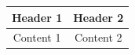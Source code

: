 \documentclass{article}
\begin{document}
\begin{tabular}{|c|c|}
\hline
\rowcolor[gray]{0.9}
\parbox[c]{3cm}{\vspace{0.2cm}\centering\textbf{Header 1}\vspace{0.2cm}} & \parbox[c]{3cm}{\vspace{0.2cm}\centering\textbf{Header 2}\vspace{0.2cm}} \\ \hline
\parbox[c]{3cm}{\vspace{0.2cm}\centering Content 1\vspace{0.2cm}} & \parbox[c]{3cm}{\vspace{0.2cm}\centering Content 2\vspace{0.2cm}} \\ \hline
\end{tabular}
\end{document}
